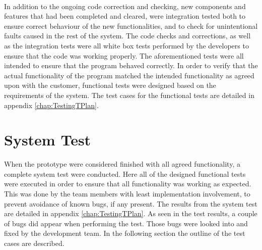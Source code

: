 \paragraph{} In addition to the ongoing code correction and checking, new components and features that had been completed and cleared, were integration tested both to ensure correct behaviour of the new functionalities, and to check for unintentional faults caused in the rest of the system. The code checks and corrections, as well as the integration tests were all white box tests performed by the developers to ensure that the code was working properly. The aforementioned tests were all intended to ensure that the program behaved correctly. In order to verify that the actual functionality of the program matched the intended functionality as agreed upon with the customer, functional tests were designed based on the requirements of the system. The test cases for the functional tests are detailed in appendix \ref{chap:TestingTPlan}. %

\section{System Test}
\label{sec:TestingSystem}

When the prototype were considered finished with all agreed functionality, a complete system test were conducted. Here all of the designed functional tests were executed  in order to ensure that all functionality was working as expected. This was done by the team members with least implementation involvement, to prevent avoidance of known bugs, if any present. The results from the system test are detailed in appendix \ref{chap:TestingTPlan}. As seen in the test results, a couple of bugs did appear when performing the test. Those bugs were looked into and fixed by the development team. In the following section the outline of the test cases are described.


